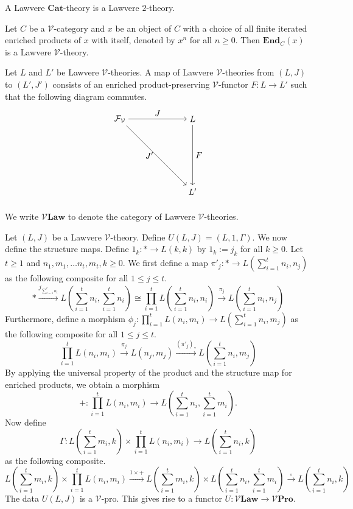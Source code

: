 \documentclass{tac}
\begin{document}
\begin{example}
A Lawvere $\mathbf{Cat}$-theory is a Lawvere $2$-theory.
\end{example}

\begin{example}
Let $C$ be a $\mathcal{V}$-category and $x$ be an object of $C$ with a choice of all finite iterated enriched products of $x$ with itself, denoted by $x^n$ for all $n\geq 0$. Then $\mathbf{End}_C(x)$ is a Lawvere $\mathcal{V}$-theory.
\end{example}

\begin{definition}
Let $L$ and $L'$ be Lawvere $\mathcal{V}$-theories. A map of Lawvere $\mathcal{V}$-theories from $(L,J)$ to $(L',J')$ consists of an enriched product-preserving $\mathcal{V}$-functor $F:L\to L'$  such that the following diagram commutes. 
    \[
    \begin{tikzpicture}[node distance=3cm]
        \node (A) {$\mathcal{F}_\mathcal{V}$};
        \node (B)[right of=A]{$L$};
        \node (C)[below of=B]{$L'$};
        \draw[->](A) to node[above] {$J$} (B);
        \draw[->](A) to node[left] {$J'$} (C);
        \draw[->](B) to node[right]{$F$}(C);
    \end{tikzpicture}
    \]
    
\end{definition}

We write $\mathcal{V}\mathbf{Law}$ to denote the category of Lawvere $\mathcal{V}$-theories.

Let $(L,J)$ be a Lawvere $\mathcal{V}$-theory. Define $U(L,J)=(L,1,\Gamma)$. We now define the structure maps. Define $1_k:*\to L(k,k)$ by $1_k:=j_k$ for all $k\geq 0$. Let $t\geq 1$ and $n_1,m_1,\dots n_t,m_t,k\geq 0$. We first define a map $\pi'_j:*\to L(\sum_{i=1}^tn_i,n_j)$ as the following composite for all $1\leq j\leq t$.
\[
*\xrightarrow{j_{\sum_{i=1}^tn_i}}L(\sum_{i=1}^tn_i,\sum_{i=1}^tn_i)\cong \prod_{i=1}^tL(\sum_{i=1}^tn_i,n_i)\xrightarrow{\pi_j}L(\sum_{i=1}^tn_i,n_j)
\]
Furthermore, define a morphism $\phi_j:\prod_{i=1}^tL(n_i,m_i)\to L(\sum_{i=1}^tn_i,m_j)$ as the following composite for all $1\leq j\leq t$.
\[
\prod_{i=1}^tL(n_i,m_i)\xrightarrow{\pi_j}L(n_j,m_j)\xrightarrow{(\pi'_j)_*}L(\sum_{i=1}^tn_i,m_j)
\]
By applying the universal property of the product and the structure map for enriched products, we obtain a morphism 
\[
+:\prod_{i=1}^tL(n_i,m_i)\to L(\sum_{i=1}^tn_i,\sum_{i=1}^tm_i).
\]
Now define 
\[
\Gamma:L(\sum_{i=1}^tm_i,k)\times\prod_{i=1}^tL(n_i,m_i)\to L(\sum_{i=1}^tn_i,k)
\]
as the following composite.
\[
L(\sum_{i=1}^tm_i,k)\times\prod_{i=1}^tL(n_i,m_i)\xrightarrow{1\times +}L(\sum_{i=1}^tm_i,k)\times L(\sum_{i=1}^tn_i,\sum_{i=1}^tm_i)\xrightarrow{\circ}L(\sum_{i=1}^tn_i,k)
\]
The data $U(L,J)$ is a $\mathcal{V}$-pro. This gives rise to a functor $U:\mathcal{V}\mathbf{Law}\to\mathcal{V}\mathbf{Pro}$.
 
\end{document}
